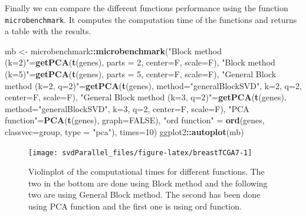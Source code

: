 \documentclass[]{article}
\newenvironment{Shaded}{\begin{snugshade}}{\end{snugshade}}
\newcommand{\KeywordTok}[1]{\textcolor[rgb]{0.13,0.29,0.53}{\textbf{#1}}}
\newcommand{\DataTypeTok}[1]{\textcolor[rgb]{0.13,0.29,0.53}{#1}}
\newcommand{\DecValTok}[1]{\textcolor[rgb]{0.00,0.00,0.81}{#1}}
\newcommand{\StringTok}[1]{\textcolor[rgb]{0.31,0.60,0.02}{#1}}
\newcommand{\OtherTok}[1]{\textcolor[rgb]{0.56,0.35,0.01}{#1}}
\newcommand{\OperatorTok}[1]{\textcolor[rgb]{0.81,0.36,0.00}{\textbf{#1}}}
\newcommand{\NormalTok}[1]{#1}
\begin{document}
Finally we can compare the different functions performance using the
function \texttt{microbenchmark}. It computes the computation time of
the functions and returns a table with the results.

\begin{Shaded}
\begin{Highlighting}[]
\NormalTok{mb <-}\StringTok{ }\NormalTok{microbenchmark}\OperatorTok{::}\KeywordTok{microbenchmark}\NormalTok{(}\StringTok{"Block method (k=2)"}\NormalTok{=}\KeywordTok{getPCA}\NormalTok{(}\KeywordTok{t}\NormalTok{(genes), }\DataTypeTok{parts =} \DecValTok{2}\NormalTok{, }\DataTypeTok{center=}\NormalTok{F, }\DataTypeTok{scale=}\NormalTok{F),}
                               \StringTok{"Block method (k=5)"}\NormalTok{=}\KeywordTok{getPCA}\NormalTok{(}\KeywordTok{t}\NormalTok{(genes), }\DataTypeTok{parts =} \DecValTok{5}\NormalTok{, }\DataTypeTok{center=}\NormalTok{F, }\DataTypeTok{scale=}\NormalTok{F),}
                               \StringTok{"General Block method (k=2, q=2)"}\NormalTok{=}\KeywordTok{getPCA}\NormalTok{(}\KeywordTok{t}\NormalTok{(genes), }\DataTypeTok{method=}\StringTok{"generalBlockSVD"}\NormalTok{, }\DataTypeTok{k=}\DecValTok{2}\NormalTok{, }\DataTypeTok{q=}\DecValTok{2}\NormalTok{, }\DataTypeTok{center=}\NormalTok{F, }\DataTypeTok{scale=}\NormalTok{F),}
                               \StringTok{"General Block method (k=3, q=2)"}\NormalTok{=}\KeywordTok{getPCA}\NormalTok{(}\KeywordTok{t}\NormalTok{(genes), }\DataTypeTok{method=}\StringTok{"generalBlockSVD"}\NormalTok{, }\DataTypeTok{k=}\DecValTok{3}\NormalTok{, }\DataTypeTok{q=}\DecValTok{2}\NormalTok{, }\DataTypeTok{center=}\NormalTok{F, }\DataTypeTok{scale=}\NormalTok{F),}
                               \StringTok{"PCA function"}\NormalTok{=}\KeywordTok{PCA}\NormalTok{(}\KeywordTok{t}\NormalTok{(genes), }\DataTypeTok{graph=}\OtherTok{FALSE}\NormalTok{), }
                               \StringTok{"ord function"}\NormalTok{ =}\StringTok{ }\KeywordTok{ord}\NormalTok{(genes, }\DataTypeTok{classvec=}\NormalTok{group, }\DataTypeTok{type =} \StringTok{"pca"}\NormalTok{), }\DataTypeTok{times=}\DecValTok{10}\NormalTok{)}
\NormalTok{ggplot2}\OperatorTok{::}\KeywordTok{autoplot}\NormalTok{(mb)}
\end{Highlighting}
\end{Shaded}

\begin{figure}

{\centering \texttt{[image: svdParallel\_files/figure-latex/breastTCGA7-1]} 

}

\caption{Violinplot of the computational times for different functions. The two in the bottom are done using Block method and the following two are using General Block method. The second has been done using PCA function and the first one is using ord function.}\label{fig:breastTCGA7}
\end{figure}
\end{document}
